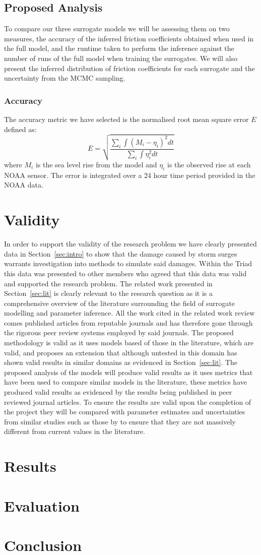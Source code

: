 \documentclass[12pt,a4paper]{article}
\begin{document}
\subsection{Proposed Analysis}
\noindent
To compare our three surrogate models we will be assessing them on two measures, the accuracy of the inferred friction coefficients obtained when used in the full model, and the runtime taken to perform the inference against the number of runs of the full model when training the surrogates. We will also present the inferred distribution of friction coefficients for each surrogate and the uncertainty from the MCMC sampling.
\subsubsection{Accuracy}
\noindent
The accuracy metric we have selected is the normalised root mean square error $E$ defined as:
\begin{equation}
	E=\sqrt{\frac{\sum_{i}\int(M_i-\eta_i)^2dt}{\sum_{i}\int\eta^2_idt}}
\end{equation}
where $M_i$ is the sea level rise from the model and $\eta_i$ is the observed rise at each NOAA sensor. The error is integrated over a 24 hour time period provided in the NOAA data.
\section{Validity}\label{sec:val}
\noindent
In order to support the validity of the research problem we have clearly presented data in Section~\ref{sec:intro} to show that the damage caused by storm surges warrants investigation into methods to simulate said damages. Within the Triad this data was presented to other members who agreed that this data was valid and supported the research problem. The related work presented in Section~\ref{sec:lit} is clearly relevant to the research question as it is a comprehensive overview of the literature surrounding the field of surrogate modelling and parameter inference. All the work cited in the related work review comes published articles from reputable journals and has therefore gone through the rigorous peer review systems employed by said journals. The proposed methodology is valid as it uses models based of those in the literature, which are valid, and proposes an extension that although untested in this domain has shown valid results in similar domains as evidenced in Section~\ref{sec:lit}. The proposed analysis of the models will produce valid results as it uses metrics that have been used to compare similar models in the literature, these metrics have produced valid results as evidenced by the results being published in peer reviewed journal articles. To ensure the results are valid upon the completion of the project they will be compared with parameter estimates and uncertainties from similar studies such as those by  to ensure that they are not massively different from current values in the literature.
\section{Results}
\noindent
\section{Evaluation}
\noindent
\section{Conclusion}
\noindent

\end{document}
